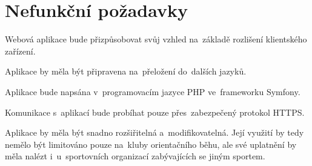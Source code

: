 \section{Nefunkční požadavky}
\begin{enumerate}[label=\textcolor{decoration}{\textbf{N\arabic*}}]
	Webová aplikace bude přizpůsobovat svůj vzhled na~základě rozlišení klientského zařízení.

	Aplikace by měla být připravena na~přeložení do~dalších jazyků.

	Aplikace bude napsána v~programovacím jazyce PHP ve~frameworku Symfony.

	Komunikace s~aplikací bude probíhat pouze přes~zabezpečený protokol HTTPS.

	Aplikace by měla být snadno rozšiřitelná a~modifikovatelná. Její využití by tedy nemělo být limitováno pouze na~kluby orientačního běhu, ale své uplatnění by měla nalézt i~u~sportovních organizací zabývajících se jiným sportem.

\end{enumerate}

